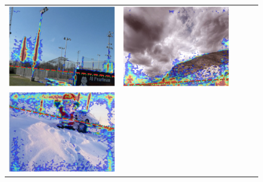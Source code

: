 \begin{figure}
\begin{tabular}{@{}c@{}c@{}c@{}c@{}c@{}}
\includegraphics[width=\sgbpwidth\linewidth]{figures/nn_analysis/sgbp/pano_ayfwzaseviqbww_jpg-2.png} &
\includegraphics[width=\sgbpwidth\linewidth]{figures/nn_analysis/sgbp/pano_addtfngrqwwyvb_jpg-6.png} \\
\includegraphics[width=\sgbpwidth\linewidth]{figures/nn_analysis/sgbp/pano_addtwdtklktubg_jpg-3.png} &

\end{tabular}
\end{figure}
